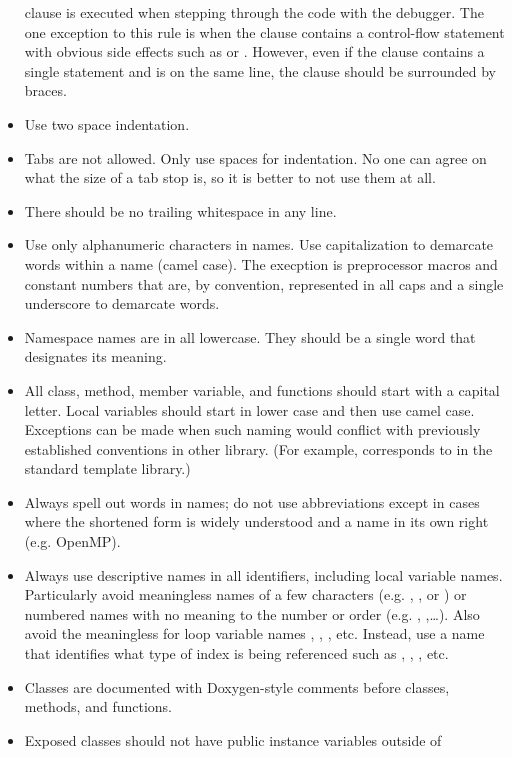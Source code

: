 \begin{itemize}
  clause is executed when stepping through the code with the debugger. The
  one exception to this rule is when the clause contains a control-flow
  statement with obvious side effects such as  or
  . However, even if the clause contains a single statement
  and is on the same line, the clause should be surrounded by braces.
\item Use two space indentation.
\item Tabs are not allowed. Only use spaces for indentation. No one can
  agree on what the size of a tab stop is, so it is better to not use them
  at all.
\item There should be no trailing whitespace in any line.
\item Use only alphanumeric characters in names. Use capitalization to
  demarcate words within a name (camel case). The execption is preprocessor
  macros and constant numbers that are, by convention, represented in all
  caps and a single underscore to demarcate words.
\item Namespace names are in all lowercase. They should be a single word
  that designates its meaning.
\item All class, method, member variable, and functions should start with a
  capital letter. Local variables should start in lower case and then use
  camel case. Exceptions can be made when such naming would conflict with
  previously established conventions in other library. (For example,
   corresponds to  in the
  standard template library.)
\item Always spell out words in names; do not use abbreviations except in
  cases where the shortened form is widely understood and a name in its own
  right (e.g. OpenMP).
\item Always use descriptive names in all identifiers, including local
  variable names. Particularly avoid meaningless names of a few characters
  (e.g. , , or ) or numbered names
  with no meaning to the number or order (e.g. ,
  ,\ldots). Also avoid the meaningless for loop variable
  names , , , etc. Instead, use a name
  that identifies what type of index is being referenced such as
  , , ,
  etc.
\item Classes are documented with Doxygen-style comments before classes,
  methods, and functions.
\item Exposed classes should not have public instance variables outside of

\end{itemize}
